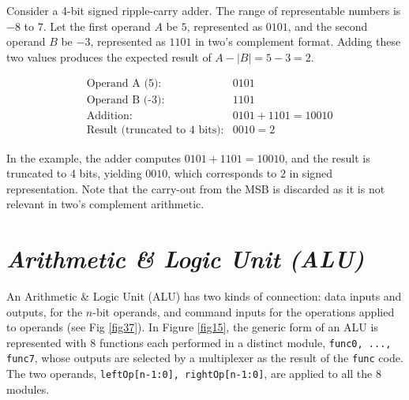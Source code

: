 {Consider a 4-bit signed ripple-carry adder. The range of representable numbers is \( -8 \) to \( 7 \). Let the first operand \( A \) be \( 5 \), represented as \( 0101 \), and the second operand \( B \) be \( -3 \), represented as \( 1101 \) in two's complement format. Adding these two values produces the expected result of \( A - |B| = 5 - 3 = 2 \).

\[
\begin{aligned}
&\text{Operand A (5):} & 0101 \\
&\text{Operand B (-3):} & 1101 \\
&\text{Addition:} & 0101 + 1101 = 10010 \\
&\text{Result (truncated to 4 bits):} & 0010 = 2
\end{aligned}
\]

In the example, the adder computes \( 0101 + 1101 = 10010 \), and the result is truncated to 4 bits, yielding \( 0010 \), which corresponds to \( 2 \) in signed representation. Note that the carry-out from the MSB is discarded as it is not relevant in two's complement arithmetic. 

}%


\section{ \textit{\textbf{Arithmetic \& Logic Unit (ALU)}}}\label{alu1}  

An Arithmetic \& Logic Unit (ALU) has two kinds of connection: data inputs and outputs, for the $n$-bit operands, and command inputs for the operations applied to operands (see Fig \ref{fig37}). In Figure \ref{fig15}, the generic form of an ALU is represented with 8 functions each performed in a distinct module, {\tt func0, ..., func7}, whose outputs are selected by a multiplexer as the result of the {\tt func} code. The two operands, {\tt leftOp[n-1:0], rightOp[n-1:0]}, are applied to all the 8 modules.





